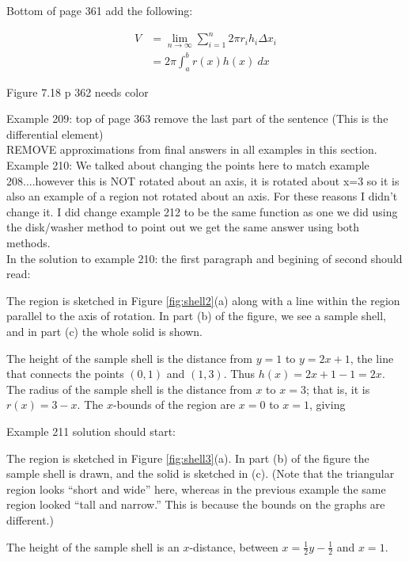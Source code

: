 \documentclass[10pt]{article}
\begin{document}
Bottom of page 361 add the following: 

\begin{align*}
V&=\lim_{n\to \infty} \sum_{i=1}^n 2\pi r_i h_i \Delta x_i\\
&=2\pi \int_a^b r(x)h(x)~dx
\end{align*}

Figure 7.18 p 362 needs color

Example 209:  top of page 363 remove the last part of the sentence (This is the differential element) \\

REMOVE approximations from final answers in all examples in this section.\\


Example 210:  %
We talked about changing the points here to match example 208....however this is NOT rotated about an axis, it is rotated about x=3 so it is also an example of a region not rotated about an axis. For these reasons I didn't change it. I did change example 212 to be the same function as one we did using the disk/washer method to point out we get the same answer using both methods.\\

In the solution to example 210: the first paragraph and begining of second should read:

The region is sketched in Figure \ref{fig:shell2}(a) along with a line within the region parallel to the axis of rotation. In part (b) of the figure, we see a sample shell, and in part (c) the whole solid is shown.

The height of the sample shell is the distance from $y=1$ to $y=2x+1$, the line that connects the points $(0,1)$ and $(1,3)$. Thus $h(x) = 2x+1-1 = 2x$. The radius of the sample shell is the distance from $x$ to $x=3$; that is, it is $r(x)=3-x$. The $x$-bounds of the region are $x=0$ to $x=1$, giving



Example 211 solution should start:  

The region is sketched in Figure \ref{fig:shell3}(a). In part (b) of the figure the sample shell is drawn, and the solid is sketched in (c). (Note that the triangular region looks ``short and wide'' here, whereas in the previous example the same region looked ``tall and narrow.'' This is because the bounds on the graphs are different.)

The height of the sample shell is an $x$-distance, between $x=\frac12y-\frac12$ and $x=1$.
\end{document}
